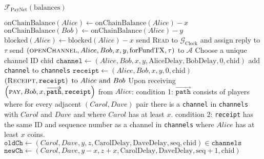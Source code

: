 \begin{functionality}{$\mathcal{F}_{\mathrm{PayNet}}
\left(\mathrm{balances}\right)$}
\begin{algorithmic}[1]
        \State $\mathrm{onChainBalance}\left(Alice\right) \gets
        \mathrm{onChainBalance}\left(Alice\right) - x$
        \State $\mathrm{onChainBalance}\left(Bob\right) \gets
        \mathrm{onChainBalance}\left(Alice\right) - y$
        \State $\mathrm{blocked}\left(Alice\right) \gets
        \mathrm{blocked}\left(Alice\right) - x$
        \State send \textsc{Read} to $\mathcal{G}_{\mathrm{Clock}}$ and assign
        reply to $\tau$
        \State send $\left(\textsc{openChannel}, Alice, Bob, x, y,
        \mathrm{forFundTX}, \tau\right)$ to $\mathcal{A}$ 
        \State Choose a unique channel ID chid
        \State $\mathtt{channel} \gets \left(Alice, Bob, x, y,
        \mathrm{AliceDelay}, \mathrm{BobDelay}, 0, \mathrm{chid}\right)$
        \State add \texttt{channel} to \texttt{channels}
        \State $\mathtt{receipt} \gets \left(Alice, Bob, x, y, 0,
        \mathrm{chid}\right)$
        \State \Return $\left(\textsc{Receipt}, \mathtt{receipt}\right) \text{
        to } Alice \text{ and } Bob$
      \EndIf
    \EndIndent
    \State {}
    \State {}
    \State Upon receiving $\left(\textsc{pay}, Bob, x,
    \overrightarrow{\mathtt{path}}, \mathtt{receipt}\right)$ from $Alice$:
    \Indent
      \State condition 1: $\overrightarrow{\mathtt{path}}$ consists of players
      where for every adjacent $\left(Carol, Dave\right)$ pair there is a
      \texttt{channel} in \texttt{channels} with $Carol$ and $Dave$ and where
      $Carol$ has at least $x$.
      \State condition 2: \texttt{receipt} has the same ID and sequence number
      as a channel in \texttt{channels} where $Alice$ has at least $x$ coins.
          \State $\mathtt{oldCh} \gets \left(Carol, Dave, y, z,
          \mathrm{CarolDelay}, \mathrm{DaveDelay}, \mathrm{seq},
          \mathrm{chid}\right) \in \mathtt{channels}$
          \State $\mathtt{newCh} \gets \left(Carol, Dave, y - x, z + x,
          \mathrm{CarolDelay}, \mathrm{DaveDelay}, \mathrm{seq} + 1,
          \mathrm{chid}\right)$

\end{algorithmic}
\end{functionality}
